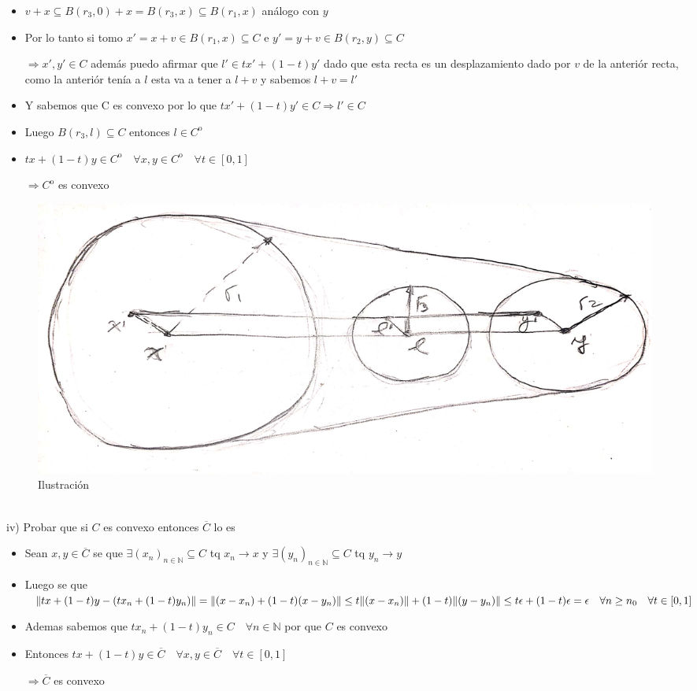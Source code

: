 \documentclass[12pt]{article}
\newcommand{\N}{\mathbb{N}}
\newcommand{\Ra}{\Rightarrow}
\newcommand{\ra}{\rightarrow}
\newcommand{\ol}{\overline}
\DeclarePairedDelimiter{\norm}{\lVert}{\rVert}
\begin{document}
\begin{enumerate}[i)]
\begin{itemize}
			\item $v + x \subseteq B(r_{3},0) + x = B(r_{3},x) \subseteq B(r_{1},x)$ análogo con $y$

			\item Por lo tanto si tomo $x' = x + v \in B(r_{1},x) \subseteq C $ e $y'= y + v \in B(r_{2}, y) \subseteq C$

			$\Ra x',y' \in C$ además puedo afirmar que $l' \in tx' + (1-t)y' $ dado que esta recta es un desplazamiento dado por $v$ de la anteriór recta, como la anteriór tenía a $l$ esta va a tener a $l+v$ y sabemos $l+v=l'$
				
			\item Y sabemos que C es convexo por lo que $ tx' + (1-t)y' \in C \Ra l' \in C$

			\item Luego $B(r_{3},l) \subseteq C$ entonces $l \in C^\mathrm{o}$

			\item $tx + (1-t)y \in C^\mathrm{o} \quad \forall x,y \in C^\mathrm{o} \quad \forall t \in [0,1]$

			$\Ra C^\mathrm{o}$ es convexo

		\end{itemize}
\begin{figure}[ht!]
	\includegraphics[width=\linewidth]{image.jpg}
	\caption{Ilustración}		
\end{figure}
\end{enumerate}

\newpage
\noindent
\\
iv) Probar que si $C$ es convexo entonces $\ol C$ lo es
\begin{itemize}
	\item Sean $x,y \in \ol C$ se que $ \exists (x_{n})_{n\in \N} \subseteq C $ tq $x_{n} \ra x$ y $\exists (y_{n})_{n\in\N} \subseteq C$ tq $  y_{n} \ra  y$

	\item Luego se que $\norm {tx + (1-t)y - (tx_{n} + (1-t)y_{n})} = \norm {(x-x_{n}) + (1-t)(x-y_{n})} \leq t\norm{(x-x_{n})} + (1-t)\norm{(y-y_{n})} \leq t\epsilon + (1-t) \epsilon = \epsilon \quad \forall n \geq n_{0} \quad \forall t\in [0,1]$

	\item Ademas sabemos que $tx_{n} + (1-t)y_{n} \in C \quad \forall n \in \N$ por que $C$ es convexo

	\item Entonces $tx + (1-t)y \in \ol C \quad \forall x,y \in \ol C \quad \forall t \in [0,1]$

	$\Ra \ol C$ es convexo
\end{itemize}
\end{document}
